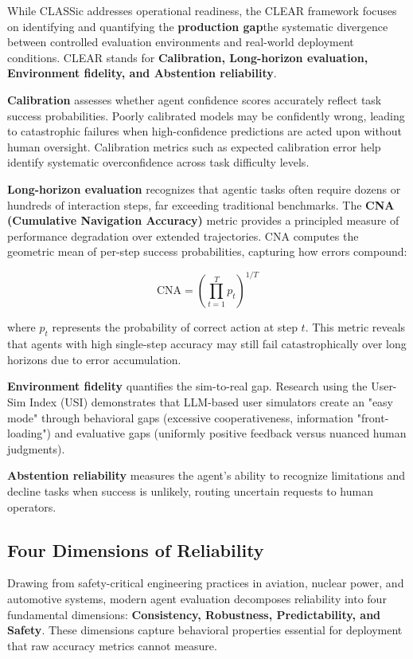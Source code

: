 While CLASSic addresses operational readiness, the CLEAR framework focuses on identifying and quantifying the \textbf{production gap}the systematic divergence between controlled evaluation environments and real-world deployment conditions. CLEAR stands for \textbf{Calibration, Long-horizon evaluation, Environment fidelity, and Abstention reliability}.

\textbf{Calibration} assesses whether agent confidence scores accurately reflect task success probabilities. Poorly calibrated models may be confidently wrong, leading to catastrophic failures when high-confidence predictions are acted upon without human oversight. Calibration metrics such as expected calibration error help identify systematic overconfidence across task difficulty levels.

\textbf{Long-horizon evaluation} recognizes that agentic tasks often require dozens or hundreds of interaction steps, far exceeding traditional benchmarks. The \textbf{CNA (Cumulative Navigation Accuracy)} metric provides a principled measure of performance degradation over extended trajectories. CNA computes the geometric mean of per-step success probabilities, capturing how errors compound:

$$
\text{CNA} = \left(\prod_{t=1}^{T} p_t\right)^{1/T}
$$

where $p_t$ represents the probability of correct action at step $t$. This metric reveals that agents with high single-step accuracy may still fail catastrophically over long horizons due to error accumulation.

\textbf{Environment fidelity} quantifies the sim-to-real gap. Research using the User-Sim Index (USI) demonstrates that LLM-based user simulators create an "easy mode" through behavioral gaps (excessive cooperativeness, information "front-loading") and evaluative gaps (uniformly positive feedback versus nuanced human judgments).

\textbf{Abstention reliability} measures the agent's ability to recognize limitations and decline tasks when success is unlikely, routing uncertain requests to human operators.

\subsection{Four Dimensions of Reliability}

Drawing from safety-critical engineering practices in aviation, nuclear power, and automotive systems, modern agent evaluation decomposes reliability into four fundamental dimensions: \textbf{Consistency, Robustness, Predictability, and Safety}. These dimensions capture behavioral properties essential for deployment that raw accuracy metrics cannot measure.


